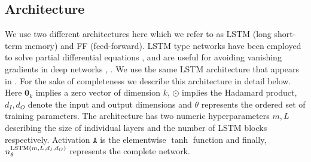 \subsection{Architecture} \label{ssec-arch--var-ml}
We use two different architectures here which we refer to as LSTM (long short-term memory) and FF (feed-forward). LSTM type networks have been employed to solve partial differential equations \cite{sirignano2018dgm}, \cite{mandal2023learning} and are useful for avoiding vanishing gradients in deep networks \cite{sherstinsky2020fundamentals}, \cite{vennerod2021long}. We use the same LSTM architecture that appears in \cite{mandal2023learning}. For the sake of completeness we describe this architecture in detail below. Here $\mathbf 0_k$ implies a zero vector of dimension $k$, $\odot$ implies the Hadamard product, $d_I, d_O$ denote the input and output dimensions and $\theta$ represents the ordered set of training parameters. The architecture has two numeric hyperparameters $m, L$ describing the size of individual layers and the number of LSTM blocks respectively. Activation $\mathtt A$ is the elementwise $\tanh$ function and finally, $n^{{\rm LSTM}(m, L, d_I, d_O)}_\theta$ represents the complete network.

